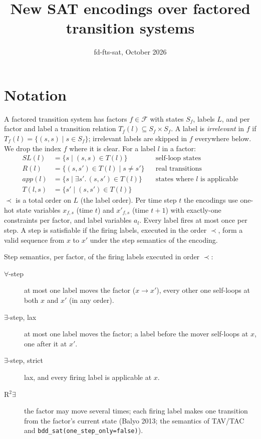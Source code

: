 \documentclass[11pt,a4paper]{article}
\title{New SAT encodings over factored transition systems}
\author{fd-fts-sat, October 2026}
\date{}
\newcommand{\lab}[1]{a_{#1}}            %
\newcommand{\st}[1]{x_{#1}}             %
\newcommand{\stn}[1]{x'_{#1}}           %
\newcommand{\SL}{\mathit{SL}}
\newcommand{\R}{R}
\newcommand{\app}{\mathit{app}}
\begin{document}
\maketitle

\section{Notation}

A factored transition system has factors $f \in \mathcal F$ with states $S_f$, labels $L$, and per
factor and label a transition relation $T_f(l) \subseteq S_f \times S_f$. A label is
\emph{irrelevant} in $f$ if $T_f(l) = \{(s,s) \mid s \in S_f\}$; irrelevant labels are skipped in
$f$ everywhere below. We drop the index $f$ where it is clear. For a label $l$ in a factor:
\begin{align*}
  \SL(l) &= \{s \mid (s,s) \in T(l)\} && \text{self-loop states}\\
  \R(l) &= \{(s,s') \in T(l) \mid s \neq s'\} && \text{real transitions}\\
  \app(l) &= \{s \mid \exists s'.\,(s,s') \in T(l)\} && \text{states where $l$ is applicable}\\
  T(l,s) &= \{s' \mid (s,s') \in T(l)\}
\end{align*}
$\prec$ is a total order on $L$ (the label order). Per time step $t$ the encodings use one-hot
state variables $\st{f,s}$ (time $t$) and $\stn{f,s}$ (time $t+1$) with exactly-one constraints
per factor, and label variables $\lab{l}$. Every label fires at most once per step. A step is
satisfiable if the firing labels, executed in the order $\prec$, form a valid sequence from $x$ to
$x'$ under the step semantics of the encoding.

Step semantics, per factor, of the firing labels executed in order $\prec$:
\begin{description}
  \item[$\forall$-step] at most one label moves the factor ($x \to x'$), every other one self-loops at
        both $x$ and $x'$ (in any order).
  \item[$\exists$-step, lax] at most one label moves the factor; a label before the mover self-loops at
        $x$, one after it at $x'$.
  \item[$\exists$-step, strict] lax, and every firing label is applicable at $x$.
  \item[R$^2\exists$] the factor may move several times; each firing label makes one transition from
        the factor's current state (Balyo 2013; the semantics of TAV/TAC and
        \texttt{bdd\_sat(one\_step\_only=false)}).
\end{description}
\end{document}
